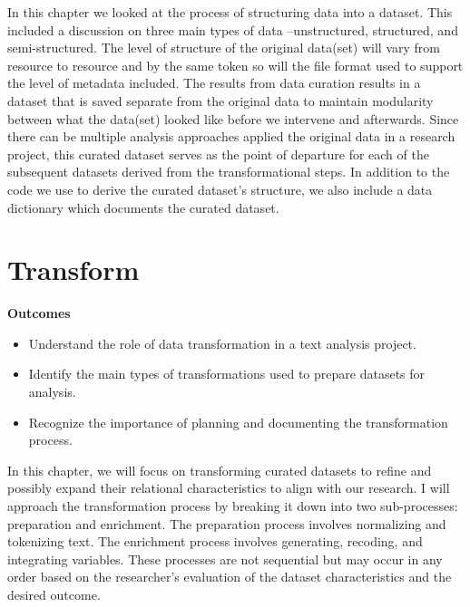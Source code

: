 \documentclass[
  letterpaper,
]{book}
\providecommand{\tightlist}{%
  \setlength{\itemsep}{0pt}\setlength{\parskip}{0pt}}\usepackage{longtable,booktabs,array}
\theoremstyle{definition}
\theoremstyle{remark}
\begin{document}

In this chapter we looked at the process of structuring data into a
dataset. This included a discussion on three main types of data
--unstructured, structured, and semi-structured. The level of structure
of the original data(set) will vary from resource to resource and by the
same token so will the file format used to support the level of metadata
included. The results from data curation results in a dataset that is
saved separate from the original data to maintain modularity between
what the data(set) looked like before we intervene and afterwards. Since
there can be multiple analysis approaches applied the original data in a
research project, this curated dataset serves as the point of departure
for each of the subsequent datasets derived from the transformational
steps. In addition to the code we use to derive the curated dataset's
structure, we also include a data dictionary which documents the curated
dataset.

\chapter{Transform}\label{sec-transform-chapter}

\begin{tcolorbox}[enhanced jigsaw, breakable, colframe=quarto-callout-color-frame, toprule=.15mm, arc=.35mm, colback=white, left=2mm, bottomrule=.15mm, rightrule=.15mm, opacityback=0, leftrule=.75mm]

\textbf{ Outcomes}

\begin{itemize}
\tightlist
\item
  Understand the role of data transformation in a text analysis project.
\item
  Identify the main types of transformations used to prepare datasets
  for analysis.
\item
  Recognize the importance of planning and documenting the
  transformation process.
\end{itemize}

\end{tcolorbox}

In this chapter, we will focus on transforming curated datasets to
refine and possibly expand their relational characteristics to align
with our research. I will approach the transformation process by
breaking it down into two sub-processes: preparation and enrichment. The
preparation process involves normalizing and tokenizing text. The
enrichment process involves generating, recoding, and integrating
variables. These processes are not sequential but may occur in any order
based on the researcher's evaluation of the dataset characteristics and
the desired outcome.
\end{document}
